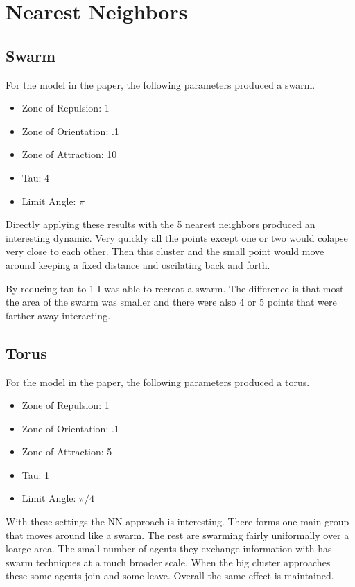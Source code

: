 \documentclass[12pt]{article}
\begin{document}
\section*{Nearest Neighbors}

\subsection*{Swarm}

For the model in the paper, the following parameters produced a swarm.

\begin{itemize}
  \item{Zone of Repulsion: 1}
  \item{Zone of Orientation: .1}
  \item{Zone of Attraction: 10}
  \item{Tau: 4}
  \item{Limit Angle: $\pi$}
\end{itemize}

Directly applying these results with the 5 nearest neighbors produced an interesting dynamic. Very quickly 
all the points except one or two would colapse very close to each other. Then this cluster and the small point would 
move around keeping a fixed distance and oscilating back and forth.

By reducing tau to 1 I was able to recreat a swarm. The difference is that most the area of the swarm was smaller
and there were also 4 or 5 points that were farther away interacting.

\subsection*{Torus}

For the model in the paper, the following parameters produced a torus.

\begin{itemize}
  \item{Zone of Repulsion: 1}
  \item{Zone of Orientation: .1}
  \item{Zone of Attraction: 5}
  \item{Tau: 1}
  \item{Limit Angle: $\pi / 4$}
\end{itemize}

With these settings the NN approach is interesting. There forms one main group that moves around like a swarm. 
The rest are swarming fairly uniformally over a loarge area. The small number of agents they exchange information with 
has swarm techniques at a much broader scale. When the big cluster approaches these some agents join and some leave. Overall
the same effect is maintained.
\end{document}
